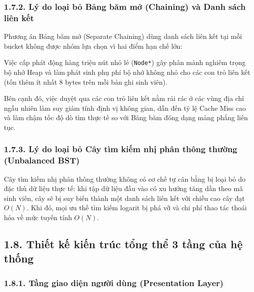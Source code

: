 \documentclass[14pt,a4paper]{extarticle}
\begin{document}
\subsubsection*{1.7.2. Lý do loại bỏ Bảng băm mở (Chaining) và Danh sách liên kết}
{}

Phương án Bảng băm mở (Separate Chaining) dùng danh sách liên kết tại mỗi bucket không được nhóm lựa chọn vì hai điểm hạn chế lớn:

Việc cấp phát động hàng triệu nút nhỏ lẻ (\texttt{Node*}) gây phân mảnh nghiêm trọng bộ nhớ Heap và làm phát sinh phụ phí bộ nhớ không nhỏ cho các con trỏ liên kết (tốn thêm ít nhất 8 bytes trên mỗi bản ghi sinh viên).

Bên cạnh đó, việc duyệt qua các con trỏ liên kết nằm rải rác ở các vùng địa chỉ ngẫu nhiên làm suy giảm tính định vị không gian, dẫn đến tỷ lệ Cache Miss cao và làm chậm tốc độ dò tìm thực tế so với Bảng băm đóng dạng mảng phẳng liên tục.

\subsubsection*{1.7.3. Lý do loại bỏ Cây tìm kiếm nhị phân thông thường (Unbalanced BST)}
{}

Cây tìm kiếm nhị phân thông thường không có cơ chế tự cân bằng bị loại bỏ do đặc thù dữ liệu thực tế: khi tập dữ liệu đầu vào có xu hướng tăng dần theo mã sinh viên, cây sẽ bị suy biến thành một danh sách liên kết với chiều cao cây đạt $O(N)$. Khi đó, mọi ưu thế tìm kiếm logarit bị phá vỡ và chi phí thao tác thoái hóa về mức tuyến tính $O(N)$.

\subsection*{1.8. Thiết kế kiến trúc tổng thể 3 tầng của hệ thống}
{}

\subsubsection*{1.8.1. Tầng giao diện người dùng (Presentation Layer)}
{}
\end{document}
